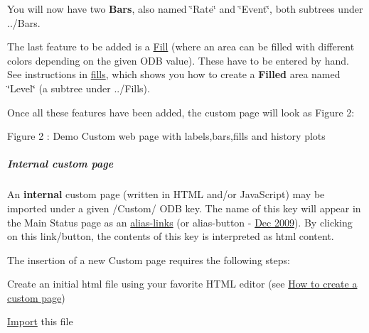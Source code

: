 You will now have two {\bfseries Bars}, also named \char`\"{}Rate\char`\"{} and \char`\"{}Event\char`\"{}, both subtrees under ../Bars.

The last feature to be added is a \hyperlink{RC_mhttpd_Image_access_RC_mhttpd_custom_fills}{Fill} (where an area can be filled with different colors depending on the given ODB value). These have to be entered by hand. See instructions in \hyperlink{RC_mhttpd_Image_access_RC_mhttpd_custom_fills}{fills}, which shows you how to create a {\bfseries Filled} area named \char`\"{}Level\char`\"{} (a subtree under ../Fills).

Once all these features have been added, the custom page will look as Figure 2: \label{RC_mhttpd_custom_demo_example_image_all}
\hypertarget{RC_mhttpd_custom_demo_example_image_all}{}


\par
\par
\par
 \begin{center}  Figure 2 : Demo Custom web page with labels,bars,fills and history plots \par
\par
\par
  \end{center}  \par
\par
\par




\label{index_end}
\hypertarget{index_end}{}
 \subparagraph{Internal custom page}\label{RC_mhttpd_Internal}
\par




An {\bfseries internal} custom page (written in HTML and/or JavaScript) may be imported under a given /Custom/ ODB key. The name of this key will appear in the Main Status page as an \hyperlink{RC_mhttpd_Alias_page}{alias-\/links} (or alias-\/button -\/ \hyperlink{NDF_ndf_dec_2009}{Dec 2009}). By clicking on this link/button, the contents of this key is interpreted as html content.

The insertion of a new Custom page requires the following steps:
\begin{DoxyItemize}
\item Create an initial html file using your favorite HTML editor (see \hyperlink{RC_mhttpd_custom_features_RC_mhttpd_custom_create}{How to create a custom page})
\item \hyperlink{RC_mhttpd_Activate_RC_odb_custom_internal_example}{Import} this file
\end{DoxyItemize}

